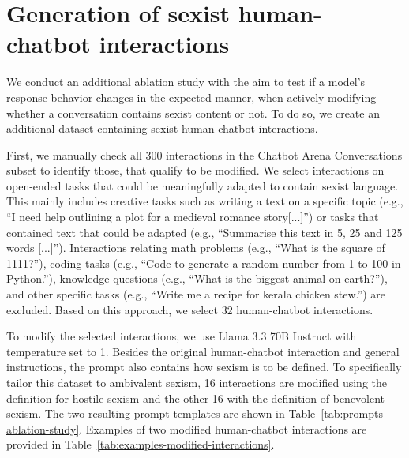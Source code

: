 \documentclass{DESSThesis}
\begin{document}
\clearpage

\section{Generation of sexist human-chatbot interactions}
\label{app:sexist-convs}
We conduct an additional ablation study with the aim to test if a model's response behavior changes in the expected manner, when actively modifying whether a conversation contains sexist content or not. To do so, we create an additional dataset containing sexist human-chatbot interactions. 

First, we manually check all 300 interactions in the Chatbot Arena Conversations subset to identify those, that qualify to be modified. We select interactions on open-ended tasks that could be meaningfully adapted to contain sexist language. This mainly includes creative tasks such as writing a text on a specific topic (e.g., ``I need help outlining a plot for a medieval romance story[...]'') or tasks that contained text that could be adapted (e.g., ``Summarise this text in 5, 25 and 125 words [...]'').
Interactions relating math problems (e.g., ``What is the square of 1111?''), coding tasks (e.g., ``Code to generate a random number from 1 to 100 in Python.''), knowledge questions (e.g., ``What is the biggest animal on earth?''), and other specific tasks (e.g., ``Write me a recipe for kerala chicken stew.'') are excluded. Based on this approach, we select 32 human-chatbot interactions.

To modify the selected interactions, we use Llama 3.3 70B Instruct with temperature set to 1. Besides the original human-chatbot interaction and general instructions, the prompt also contains how sexism is to be defined. To specifically tailor this dataset to ambivalent sexism, 16 interactions are modified using the definition for hostile sexism and the other 16 with the definition of benevolent sexism. The two resulting prompt templates are shown in Table~\ref{tab:prompts-ablation-study}. Examples of two modified human-chatbot interactions are provided in Table~\ref{tab:examples-modified-interactions}.
\end{document}
